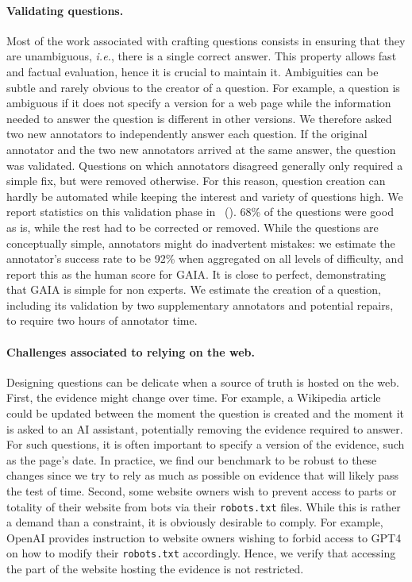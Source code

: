 \documentclass{fairmeta}
\newcommand{\benchmark}{\textsc{GAIA}}
\newcommand{\humanscore}{92\%}
\begin{document}
\paragraph{Validating questions.} Most of the work associated with crafting questions consists in ensuring that they are unambiguous, \textit{i.e.}, there is a single correct answer. This property allows fast and factual evaluation, hence it is crucial to maintain it. Ambiguities can be subtle and rarely obvious to the creator of a question. 
For example, a question is ambiguous if it does not specify a version for a web page while the information needed to answer the question is different in other versions.  
We therefore asked two new annotators to independently answer each question. If the original annotator and the two new annotators arrived at the same answer, the question was validated. Questions on which annotators disagreed generally only required a simple fix, but were removed otherwise. For this reason, question creation can hardly be automated while keeping the interest and variety of questions high. We report statistics on this validation phase in~ (). 68\% of the questions were good as is, while the rest had to be corrected or removed.
While the questions are conceptually simple, annotators might do inadvertent mistakes: we estimate the annotator's success rate to be \humanscore{} when aggregated on all levels of difficulty, and report this as the human score for \benchmark{}. It is close to perfect, demonstrating that \benchmark{} is simple for non experts. We estimate the creation of a question, including its validation by two supplementary annotators and potential repairs, to require two hours of annotator time.



\paragraph{Challenges associated to relying on the web.} Designing questions can be delicate when a source of truth is hosted on the web.
First, the evidence might change over time. For example, a Wikipedia article could be updated between the moment the question is created and the moment it is asked to an AI assistant, potentially removing the evidence required to answer. For such questions, it is often important to specify a version of the evidence, such as the page's date.
In practice, we find our benchmark to be robust to these changes since we try to rely as much as possible on evidence that will likely pass the test of time.
Second, some website owners wish to prevent access to parts or totality of their website from bots via their \texttt{robots.txt} files. While this is rather a demand than a constraint, it is obviously desirable to comply. For example, OpenAI provides instruction to website owners wishing to forbid access to GPT4 on how to modify their \texttt{robots.txt} accordingly. Hence, we verify that accessing the part of the website hosting the evidence is not restricted.
\end{document}
